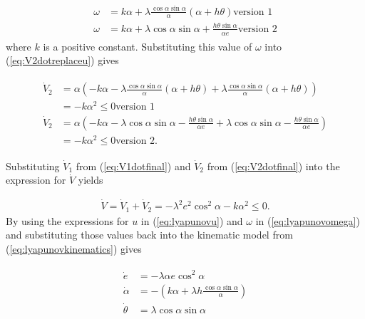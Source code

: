 \begin{align}
\label{eq:lyapunovomega}
\begin{split}
\omega &= k\alpha + \lambda\frac{\cos\alpha\sin\alpha}{\alpha}\left(\alpha+h\theta\right) \text{version 1} \\
\omega &= k\alpha + \lambda\cos\alpha\sin\alpha + \frac{h\theta\sin\alpha}{\alpha e} \text{version 2}
\end{split}
\end{align}
where $k$ is a positive constant. Substituting this value of $\omega$ into (\ref{eq:V2dotreplaceu}) gives

\begin{align}
\label{eq:V2dotfinal}
\begin{split}
\dot{V}_2 &= \alpha\left(-k\alpha-\lambda\frac{\cos\alpha\sin\alpha}{\alpha}(\alpha+h\theta) + \lambda\frac{\cos\alpha\sin\alpha}{\alpha}(\alpha+h\theta)\right) \\
&= -k\alpha^2 \leq 0 \text{version 1} \\
\dot{V}_2 &= \alpha\left(-k\alpha - \lambda\cos\alpha\sin\alpha - \frac{h\theta\sin\alpha}{\alpha e} + \lambda\cos\alpha\sin\alpha - \frac{h\theta\sin\alpha}{\alpha e}\right) \\
&= -k\alpha^2 \leq 0 \text{version 2}.
\end{split}
\end{align}

Substituting $\dot{V}_1$ from (\ref{eq:V1dotfinal}) and $\dot{V}_2$ from (\ref{eq:V2dotfinal}) into the expression for $\dot{V}$ yields

\begin{align}
\label{eq:Vfinal}
\dot{V} = \dot{V}_1 + \dot{V}_2 = -\lambda^2e^2\cos^2\alpha - k\alpha^2 \leq 0.
\end{align}
By using the expressions for $u$ in (\ref{eq:lyapunovu}) and $\omega$ in (\ref{eq:lyapunovomega}) and substituting those values back into the kinematic model from (\ref{eq:lyapunovkinematics}) gives

\begin{align}
\label{eq:lyapunovfinalkinematics}
\begin{split}
\dot{e} &= -\lambda\alpha e\cos^2\alpha \\
\dot{\alpha} &= -\left(k\alpha + \lambda h\frac{\cos\alpha\sin\alpha}{\alpha}\right) \\
\dot{\theta} &= \lambda\cos\alpha\sin\alpha
\end{split}
\end{align}